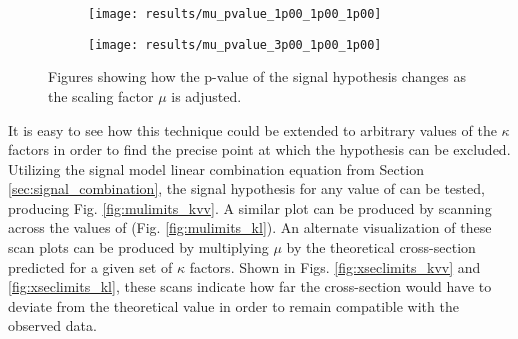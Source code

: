     \begin{figure}[!htbp]
        \centering
        \begin{subfigure}{0.48\textwidth} 
            \texttt{[image: results/mu\_pvalue\_1p00\_1p00\_1p00]}
            \caption{}%
            \label{fig:muscan_kvv1}
        \end{subfigure}
        \begin{subfigure}{0.48\textwidth}
            \texttt{[image: results/mu\_pvalue\_3p00\_1p00\_1p00]}
            \caption{}%
            \label{fig:muscan_kvv3}
        \end{subfigure}
        \caption{
            Figures showing how the p-value of the signal hypothesis changes
                as the scaling factor $\mu$ is adjusted.
        }
    \end{figure}


    It is easy to see how this technique could be extended to arbitrary values of the $\kappa$ factors
        in order to find the precise point at which the hypothesis can be excluded.
    Utilizing the signal model linear combination equation from Section \ref{sec:signal_combination},
        the signal hypothesis for any value of \kvv can be tested, producing Fig. \ref{fig:mulimits_kvv}.
    A similar plot can be produced by scanning across the values of \kl (Fig. \ref{fig:mulimits_kl}).
    An alternate visualization of these scan plots can be produced by multiplying $\mu$ by
        the theoretical cross-section predicted for a given set of $\kappa$ factors.
    Shown in Figs. \ref{fig:xseclimits_kvv} and \ref{fig:xseclimits_kl},
        these scans indicate how far the \vbfproc cross-section would have to deviate from
        the theoretical value in order to remain compatible with the observed data.

